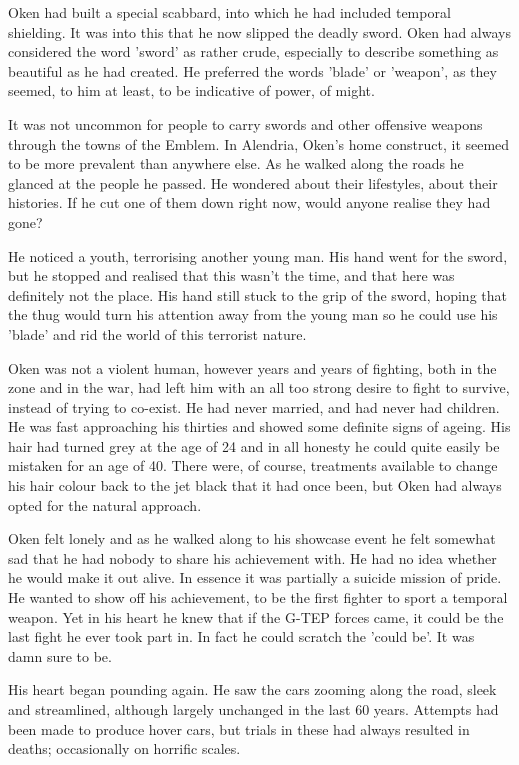 Oken had built a special scabbard, into which he had included temporal shielding.  It was into this that he now slipped the deadly sword.  Oken had always considered the word 'sword' as rather crude, especially to describe something as beautiful as he had created.  He preferred the words 'blade' or 'weapon', as they seemed, to him at least, to be indicative of power, of might.

It was not uncommon for people to carry swords and other offensive weapons through the towns of the Emblem.  In Alendria, Oken's home construct, it seemed to be more prevalent than anywhere else.  As he walked along the roads he glanced at the people he passed.  He wondered about their lifestyles, about their histories.  If he cut one of them down right now, would anyone realise they had gone?  

He noticed a youth, terrorising another young man.  His hand went for the sword, but he stopped and realised that this wasn't the time, and that here was definitely not the place.  His hand still stuck to the grip of the sword, hoping that the thug would turn his attention away from the young man so he could use his 'blade' and rid the world of this terrorist nature. 

Oken was not a violent human, however years and years of fighting, both in the zone and in the war, had left him with an all too strong desire to fight to survive, instead of trying to co-exist.  He had never married, and had never had children.  He was fast approaching his thirties and showed some definite signs of ageing.  His hair had turned grey at the age of 24 and in all honesty he could quite easily be mistaken for an age of 40.  There were, of course, treatments available to change his hair colour back to the jet black that it had once been, but Oken had always opted for the natural approach.  

Oken felt lonely and as he walked along to his showcase event he felt somewhat sad that he had nobody to share his achievement with.  He had no idea whether he would make it out alive.  In essence it was partially a suicide mission of pride.  He wanted to show off his achievement, to be the first fighter to sport a temporal weapon.  Yet in his heart he knew that if the G-TEP forces came, it could be the last fight he ever took part in.  In fact he could scratch the 'could be'.  It was damn sure to be.  

His heart began pounding again.  He saw the cars zooming along the road, sleek and streamlined, although largely unchanged in the last 60 years.  Attempts had been made to produce hover cars, but trials in these had always resulted in deaths; occasionally on horrific scales.  

